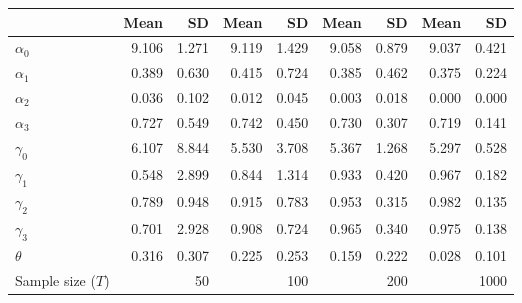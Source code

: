 
\begin{tabular}[t]{lrrrrrrrr}
\toprule
  & Mean & SD & Mean  & SD  & Mean   & SD   & Mean    & SD   \\
\midrule
$\alpha_{0}$ & 9.106 & 1.271 & 9.119 & 1.429 & 9.058 & 0.879 & 9.037 & 0.421\\
$\alpha_{1}$ & 0.389 & 0.630 & 0.415 & 0.724 & 0.385 & 0.462 & 0.375 & 0.224\\
$\alpha_{2}$ & 0.036 & 0.102 & 0.012 & 0.045 & 0.003 & 0.018 & 0.000 & 0.000\\
$\alpha_{3}$ & 0.727 & 0.549 & 0.742 & 0.450 & 0.730 & 0.307 & 0.719 & 0.141\\
$\gamma_{0}$ & 6.107 & 8.844 & 5.530 & 3.708 & 5.367 & 1.268 & 5.297 & 0.528\\
$\gamma_{1}$ & 0.548 & 2.899 & 0.844 & 1.314 & 0.933 & 0.420 & 0.967 & 0.182\\
$\gamma_{2}$ & 0.789 & 0.948 & 0.915 & 0.783 & 0.953 & 0.315 & 0.982 & 0.135\\
$\gamma_{3}$ & 0.701 & 2.928 & 0.908 & 0.724 & 0.965 & 0.340 & 0.975 & 0.138\\
$\theta$ & 0.316 & 0.307 & 0.225 & 0.253 & 0.159 & 0.222 & 0.028 & 0.101\\
Sample size ($T$) &  & 50 &  & 100 &  & 200 &  & 1000\\
\bottomrule
\end{tabular}
